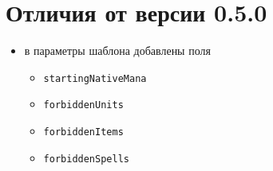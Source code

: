 \section{Отличия от версии 0.5.0}
\begin{itemize}
\item в параметры шаблона добавлены поля
\begin{itemize}
\item \texttt{startingNativeMana}
\item \texttt{forbiddenUnits}
\item \texttt{forbiddenItems}
\item \texttt{forbiddenSpells}
\end{itemize}
\end{itemize}